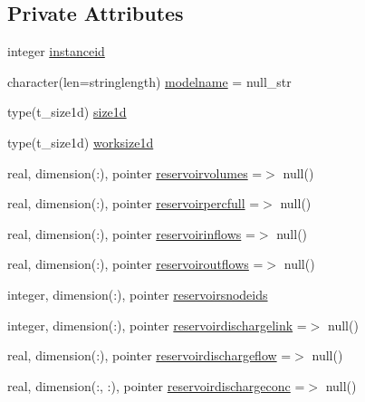 \subsection*{Private Attributes}
\begin{DoxyCompactItemize}
\item 
integer \mbox{\hyperlink{structmodulereservoirs_1_1t__reservoirs_a5d245eeabd24860f0e96ce37514aa734}{instanceid}}
\item 
character(len=stringlength) \mbox{\hyperlink{structmodulereservoirs_1_1t__reservoirs_ab103b062c23519ba2bd23ad19a020084}{modelname}} = null\+\_\+str
\item 
type(t\+\_\+size1d) \mbox{\hyperlink{structmodulereservoirs_1_1t__reservoirs_aa2881e39bc7fe3339dc1ef53c7c14110}{size1d}}
\item 
type(t\+\_\+size1d) \mbox{\hyperlink{structmodulereservoirs_1_1t__reservoirs_af3959c46bde264881b8563f2c46847bb}{worksize1d}}
\item 
real, dimension(\+:), pointer \mbox{\hyperlink{structmodulereservoirs_1_1t__reservoirs_a39ec8e1a4bd212259101b5026537be87}{reservoirvolumes}} =$>$ null()
\item 
real, dimension(\+:), pointer \mbox{\hyperlink{structmodulereservoirs_1_1t__reservoirs_a7f01ac66a27f4926ec53bd6cff7ef32c}{reservoirpercfull}} =$>$ null()
\item 
real, dimension(\+:), pointer \mbox{\hyperlink{structmodulereservoirs_1_1t__reservoirs_a2e7f1ad1514a286b02892e5ecd53c3ee}{reservoirinflows}} =$>$ null()
\item 
real, dimension(\+:), pointer \mbox{\hyperlink{structmodulereservoirs_1_1t__reservoirs_aa3efd849302a84c404f3f47e6e8949c8}{reservoiroutflows}} =$>$ null()
\item 
integer, dimension(\+:), pointer \mbox{\hyperlink{structmodulereservoirs_1_1t__reservoirs_aea4cd2fa3796797395cb0be18cf59548}{reservoirsnodeids}}
\item 
integer, dimension(\+:), pointer \mbox{\hyperlink{structmodulereservoirs_1_1t__reservoirs_a23a65859b984380c0415cef11fc113d9}{reservoirdischargelink}} =$>$ null()
\item 
real, dimension(\+:), pointer \mbox{\hyperlink{structmodulereservoirs_1_1t__reservoirs_af2113a74fd4bee67398b6c212648e398}{reservoirdischargeflow}} =$>$ null()
\item 
real, dimension(\+:, \+:), pointer \mbox{\hyperlink{structmodulereservoirs_1_1t__reservoirs_a8cce9f14e44857a79b5f7a8bc2f24352}{reservoirdischargeconc}} =$>$ null()
\item 

\end{DoxyCompactItemize}
